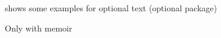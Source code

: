 %
 shows some examples for optional text (optional package)

\begin{skbmodememoir}Only with memoir\end{skbmodememoir}

